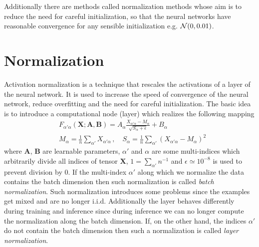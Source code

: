 \documentclass{myclass}
\begin{document}
Additionally there are methods called normalization methods whose aim is to reduce the need for
careful initialization, so that the neural networks have reasonable convergence for any sensible
initialization e.g. \(\mathcal{N}(0,0.01)\).


\section{Normalization}

Activation normalization is a technique that rescales the activations of a layer of the neural
network. It is used to increase the speed of convergence of the neural network, reduce overfitting
and the need for careful initialization. The basic idea is to introduce a computational node (layer)
which realizes the following mapping
\[
\boxed{
\begin{split}
   &F_{\alpha'\alpha}(\bm{X}; \bm{A},\bm{B}) = A_\alpha \frac{X_{\alpha'\alpha} - M_\alpha}{\sqrt{S_\alpha + \epsilon}} + B_\alpha\\
   &M_\alpha = \frac{1}{n} \sum_{\alpha'} X_{\alpha'\alpha}\,,\quad S_\alpha = \frac{1}{n} \sum_{\alpha'} (X_{\alpha'\alpha} - M_\alpha)^2
\end{split}
}
\]
where \(\bm{A}\), \(\bm{B}\) are learnable parameters, \(\alpha'\) and \(\alpha\) are some
multi-indices which arbitrarily divide all indices of tensor \(\bm{X}\), \(1 = \sum_{\alpha'}
n^{-1}\) and \(\epsilon \simeq 10^{-8}\) is used to prevent division by 0. If the multi-index
\(\alpha'\) along which we normalize the data contains the batch dimension then such normalization
is called \emph{batch normalization}. Such normalization introduces some problems since the examples
get mixed and are no longer i.i.d. Additionally the layer behaves differently during training and
inference since during inference we can no longer compute the normalization along the batch
dimension. If, on the other hand, the indices \(\alpha'\) do not contain the batch dimension then
such a normalization is called \emph{layer normalization}.
\end{document}
